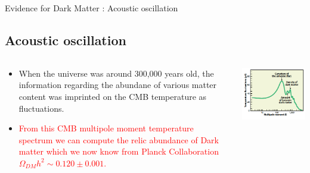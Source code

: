 \documentclass[11pt]{beamer}
\begin{document}
\begin{frame}{Evidence for Dark Matter : Acoustic oscillation}
\subsection{Acoustic oscillation}

\begin{columns}
\begin{column}{0.6\textwidth}
\begin{itemize}
\item When the universe was around 300,000 years old, the information regarding the abundane of various matter content was imprinted on the CMB temperature as fluctuations.
\item \textcolor{red}{ From this CMB multipole moment temperature spectrum we can compute the relic abundance of Dark matter which we now know from Planck Collaboration $\Omega_{DM} h^2 \sim 0.120 \pm 0.001$.}
\end{itemize}

\end{column}


\begin{column}{0.5\textwidth}
\includegraphics[scale=0.5]{cmb.png}
\end{column}

\end{columns}

\end{frame}
\end{document}
